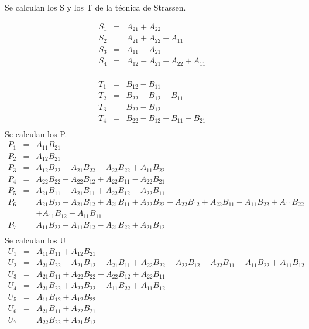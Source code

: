 \documentclass[12pt,letterpaper]{scrartcl}
\begin{document}
Se calculan los S y los T de la técnica de Strassen.


\[
\begin{array}{lcl}
	S_1 &=& A_{21} + A_{22} \\
	S_2 &=& A_{21} + A_{22} - A_{11} \\
	S_3 &=& A_{11} - A_{21}\\
	S_4 &=& A_{12} -A_{21} - A_{22} + A_{11} \\
\end{array}
\]

\[
\begin{array}{lcl}
	T_1 &=& B_12 - B_{11}\\
	T_2 &=& B_{22} - B_{12} + B_{11}\\
	T_3 &=& B_{22} - B_{12}\\
	T_4 &=& B_{22} - B_{12} + B_{11} - B_{21}\\
\end{array}
\]
Se calculan los P.
\[
\begin{array}{lcl}
	P_1 &=& A_{11}B_{21}\\
	P_2 &=& A_{12}B_{21}\\
	P_3 &=& A_{12}B_{22} - A_{21}B_{22} - A_{22}B_{22} + A_{11}B_{22}\\
	P_4 &=& A_{22}B_{22} - A_{22}B_{12} + A_{22}B_{11}  - A_{22}B_{21}\\
	P_5 &=& A_{21}B_{11} - A_{21}B_{11} + A_{22}B_{12}- A_{22}B_{11}\\
	P_6 &=& A_{21}B_{22} - A_{21}B_{12} + A_{21}B_{11} + A_{22}B_{22} - A_{22}B_{12} + A_{22}B_{11} - A_{11}B_{22}+ A_{11}B_{22}\\
	&&  + A_{11}B_{12} - A_{11}B_{11}\\
	P_7 &=& A_{11}B_{22} - A_{11}B_{12} - A_{21}B_{22} + A_{21}B_{12}\\
\end{array}
\]
Se calculan los U
\[
\begin{array}{lcl}
	U_{1} &=& A_{11}B_{11} + A_{12}B_{21}\\
	U_{2} &=& A_{21}B_{22} - A_{21}B_{12} + A_{21}B_{11} + A_{22}B_{22} - A_{22}B_{12} + A_{22}B_{11} - A_{11}B_{22} + A_{11}B_{12}\\
	U_{3} &=& A_{21}B_{11} + A_{22}B_{22} - A_{22}B_{12} + A_{22}B_{11}\\
	U_{4} &=& A_{21}B_{22} + A_{22}B_{22} - A_{11}B_{22} + A_{11}B_{12}\\
	U_{5} &=& A_{11}B_{12} + A_{12}B_{22}\\
	U_{6} &=& A_{21}B_{11} + A_{22}B_{21}\\
	U_{7} &=& A_{22}B_{22} + A_{21}B_{12}\\
\end{array}
\]
\end{document}
